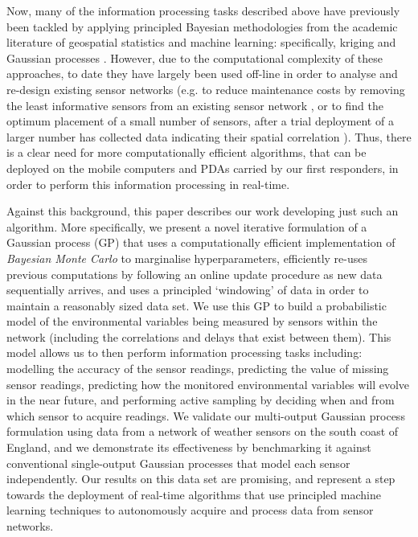 \documentclass{acmtrans2m}
\begin{document}
Now, many of the information processing tasks described above have previously been tackled by applying principled Bayesian methodologies from the academic literature of geospatial statistics and machine learning: specifically, kriging \cite{cressie} and Gaussian processes \cite{GPsBook}. However, due to the computational complexity of these approaches, to date they have largely been used off-line in order to analyse and re-design existing sensor networks (e.g. to reduce maintenance costs by removing the least informative sensors from an existing sensor network \cite{fuentes}, or to find the optimum placement of a small number of sensors, after a trial deployment of a larger number has collected data indicating their spatial correlation \cite{guestrin1}). Thus, there is a clear need for more computationally efficient algorithms, that can be deployed on the mobile computers and PDAs carried by our first responders, in order to perform this information processing in real-time.

Against this background, this paper describes our work developing just such an algorithm. More specifically, we present a novel iterative formulation of a Gaussian process (GP) that uses a computationally efficient implementation of {\em Bayesian Monte Carlo} to marginalise hyperparameters, efficiently re-uses previous computations by following an online update procedure as new data sequentially arrives, and uses a principled `windowing' of data in order to maintain a reasonably sized data set. We use this GP to build a probabilistic model of the environmental variables being measured by sensors within the network (including the correlations and delays that exist between them). This model allows us to then perform information processing tasks including: modelling the accuracy of the sensor readings, predicting the value of missing sensor readings, predicting how the monitored environmental variables will evolve in the near future, and performing active sampling by deciding when and from which sensor to acquire readings. We validate our multi-output Gaussian process formulation using data from a network of weather sensors on the south coast of England, and we demonstrate its effectiveness by benchmarking it against conventional single-output Gaussian processes that model each sensor independently. Our results on this data set are promising, and represent a step towards the deployment of real-time algorithms that use principled machine learning techniques to autonomously acquire and process data from sensor networks.
\end{document}
